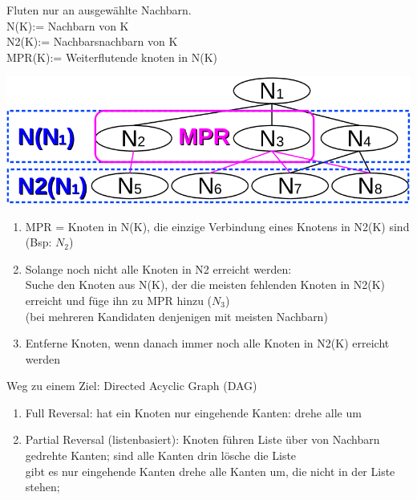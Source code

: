 \begin{minipage}{0.25\textwidth}
Fluten nur an ausgewählte Nachbarn.\\
N(K):= Nachbarn von K \\
N2(K):= Nachbarsnachbarn von K \\
MPR(K):= Weiterflutende knoten in N(K)
\end{minipage} 			
\begin{minipage}{0.25\textwidth}
\includegraphics[width=\textwidth]{OLSR}
\end{minipage} 

\begin{enumerate}
\item MPR = Knoten in N(K), die einzige Verbindung eines Knotens in N2(K) sind (Bsp: $N_2$)
\item Solange noch nicht alle Knoten in N2 erreicht werden:\\
Suche den Knoten aus N(K), der die meisten fehlenden Knoten in N2(K) erreicht und füge ihn zu MPR hinzu ($N_3$) \\
(bei mehreren Kandidaten denjenigen mit meisten Nachbarn)
\item Entferne Knoten, wenn danach immer noch alle Knoten in N2(K) erreicht werden
\end{enumerate}

Weg zu einem Ziel: Directed Acyclic Graph (DAG)\\
\begin{minipage}{0.5\textwidth}
\begin{enumerate}
\item Full Reversal: hat ein Knoten nur eingehende Kanten: drehe alle um
\item Partial Reversal (listenbasiert): Knoten führen Liste über von Nachbarn gedrehte Kanten; sind alle Kanten drin lösche die Liste\\
gibt es nur eingehende Kanten drehe alle Kanten um, die nicht in der Liste stehen; 
\end{enumerate}
\end{minipage}




